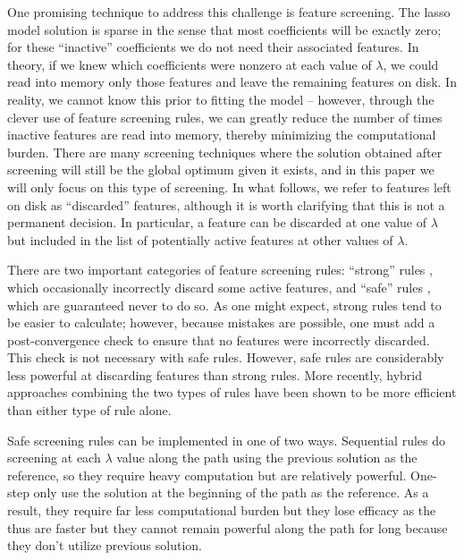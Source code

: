 One promising technique to address this challenge is feature screening. The lasso model solution is sparse in the sense that most coefficients will be exactly zero; for these ``inactive'' coefficients we do not need their associated features.  In theory, if we knew which coefficients were nonzero at each value of $\lambda$, we could read into memory only those features and leave the remaining features on disk. In reality, we cannot know this prior to fitting the model -- however, through the clever use of feature screening rules, we can greatly reduce the number of times inactive features are read into memory, thereby minimizing the computational burden. There are many screening techniques where the solution obtained after screening will still be the global optimum given it exists, and in this paper we will only focus on this type of screening. In what follows, we refer to features left on disk as ``discarded'' features, although it is worth clarifying that this is not a permanent decision.  In particular, a feature can be discarded at one value of $\lambda$ but included in the list of potentially active features at other values of $\lambda$.

There are two important categories of feature screening rules: ``strong'' rules \citep{tibshirani2011regression, qian2019fast}, which occasionally incorrectly discard some active features, and ``safe'' rules \citep{ghaoui2010safe,wang2013lasso,xiang2012fast, xiang2011learning}, which are guaranteed never to do so.  As one might expect, strong rules tend to be easier to calculate; however, because mistakes are possible, one must add a post-convergence check to ensure that no features were incorrectly discarded. This check is not necessary with safe rules. However, safe rules are considerably less powerful at discarding features than strong rules. More recently, hybrid approaches \citep{Zeng2021} combining the two types of rules have been shown to be more efficient than either type of rule alone.

Safe screening rules can be implemented in one of two ways. Sequential rules do screening at each $\lambda$ value along the path using the previous solution as the reference, so they require heavy computation but are relatively powerful. One-step only use the solution at the beginning of the path as the reference. As a result, they require far less computational burden but they lose efficacy as the thus are faster but they cannot remain powerful along the path for long because they don't utilize previous solution.

